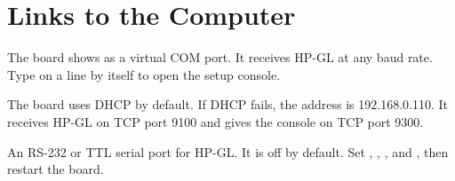 \section{Links to the Computer}

\begin{description}[style=nextline,leftmargin=1.2em,font=\sffamily\bfseries\color{navy}]
  \item[USB] The board shows as a virtual COM port. It receives HP-GL at any
        baud rate. Type  on a line by itself to open the setup
        console.
  \item[Ethernet] The board uses DHCP by default. If DHCP fails, the address is
        192.168.0.110. It receives HP-GL on TCP port 9100 and gives the
        console on TCP port 9300.
  \item[COM-0 or COM-1] An RS-232 or TTL serial port for HP-GL. It is off by
        default. Set , , , and
        , then restart the board.
\end{description}
